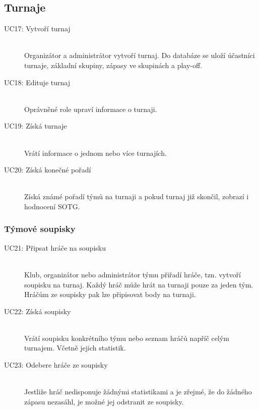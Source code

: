   \subsection*{Turnaje}
    \begin{description}
      \item[UC17: Vytvoří turnaj] \hfill \\
      Organizátor a administrátor vytvoří turnaj. Do databáze se uloží účastníci turnaje,
      základní skupiny, zápasy ve skupinách a play-off.
      \item[UC18: Edituje turnaj] \hfill \\
      Oprávněné role upraví informace o turnaji.
      \item[UC19: Získá turnaje] \hfill \\
      Vrátí informace o jednom nebo více turnajích.
      \item[UC20: Získá konečné pořadí] \hfill \\
      Získá známé pořadí týmů na turnaji a pokud turnaj již skončil, zobrazí i hodnocení SOTG.
    \end{description}
  
  \subsubsection*{Týmové soupisky}
    \begin{description}
      \item[UC21: Připsat hráče na soupisku] \hfill \\
      Klub, organizátor nebo administrátor týmu přiřadí hráče, tzn. vytvoří soupisku na turnaj.
      Každý hráč může hrát na turnaji pouze za jeden tým. Hráčům ze soupisky pak lze připisovat body na turnaji.
      \item[UC22: Získá soupisky] \hfill \\
      Vrátí soupisku konkrétního týmu nebo seznam hráčů napříč celým turnajem. Včetně jejich statistik.
      \item[UC23: Odebere hráče ze soupisky] \hfill \\
      Jestliže hráč nedisponuje žádnými statistikami a je zřejmé, že do žádného zápasu nezasáhl, je možné jej odstranit ze soupisky.
    \end{description}
    
